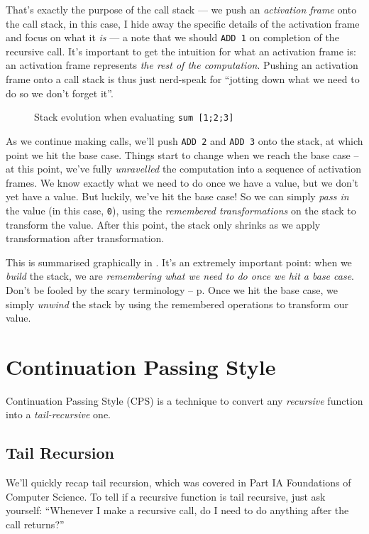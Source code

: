 That's exactly the purpose of the call stack --- we push an \emph{activation frame} onto the call stack, in this case, I hide away the specific details of the activation frame and focus on what it \emph{is} --- a note that we should \texttt{ADD 1} on completion of the recursive call. It's important to get the intuition for what an activation frame is: an activation frame represents \emph{the rest of the computation}. Pushing an activation frame onto a call stack is thus just nerd-speak for ``jotting down what we need to do so we don't forget it''. 

\begin{figure}[h]
    \centering
    
    \vspace{-10mm}
    \caption{Stack evolution when evaluating 
    \texttt{sum [1;2;3]}}
    \label{fig-sumstack}
\end{figure}

As we continue making calls, we'll push \texttt{ADD 2} and \texttt{ADD 3} onto the stack, at which point we hit the base case. Things start to change when we reach the base case -- at this point, we've fully \emph{unravelled} the computation into a sequence of activation frames. We know exactly what we need to do once we have a value, but we don't yet have a value. But luckily, we've hit the base case! So we can simply \emph{pass in} the value (in this case, \texttt{0}), using the \emph{remembered transformations} on the stack to transform the value. After this point, the stack only shrinks as we apply transformation after transformation.

This is summarised graphically in . It's an extremely important point: when we \emph{build} the stack, we are \emph{remembering what we need to do once we hit a base case}. Don't be fooled by the scary terminology -- p. Once we hit the base case, we simply \emph{unwind} the stack by using the remembered operations to transform our value.

\section{Continuation Passing Style}
Continuation Passing Style (CPS) is a technique to convert any \emph{recursive} function into a \emph{tail-recursive} one.

\subsection{Tail Recursion}
We'll quickly recap tail recursion, which was covered in {\sffamily Part IA Foundations of Computer Science}. To tell if a recursive function is tail recursive, just ask yourself: “Whenever I make a recursive call, do I need to do anything after the call returns?”

